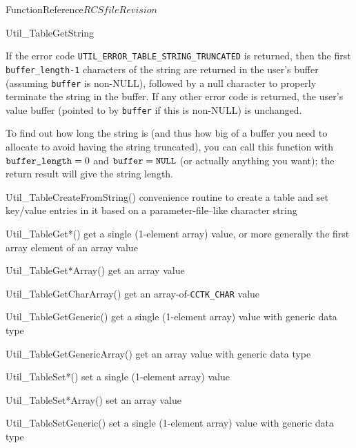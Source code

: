 \begin{cactuspart}{FunctionReference}{$RCSfile$}{$Revision$}
\begin{FunctionDescription}{Util\_TableGetString}
\begin{Discussion}
If the error code \verb|UTIL_ERROR_TABLE_STRING_TRUNCATED| is returned,
then the first \verb|buffer_length-1| characters of the string are
returned in the user's buffer (assuming \verb|buffer| is non-NULL),
followed by a null character to properly terminate the string in the
buffer.  If any other error code is returned, the user's value buffer
(pointed to by \verb|buffer| if this is non-NULL) is unchanged.

To find out how long the string is (and thus how big of a buffer you
need to allocate to avoid having the string truncated), you can call
this function with $\verb|buffer_length| = 0$ and $\verb|buffer| = \verb|NULL|$
(or actually anything you want); the return result will give the
string length.
\end{Discussion}

\begin{SeeAlsoSection}
\begin{SeeAlso}{Util\_TableCreateFromString()}
convenience routine to create a table and set key/value entries
in it based on a parameter-file--like character string
\end{SeeAlso}
\begin{SeeAlso}{Util\_TableGet*()}
get a single (1-element array) value,
or more generally the first array element of an array value
\end{SeeAlso}
\begin{SeeAlso}{Util\_TableGet*Array()}
get an array value
\end{SeeAlso}
\begin{SeeAlso}{Util\_TableGetCharArray()}
get an array-of-\verb|CCTK_CHAR| value
\end{SeeAlso}
\begin{SeeAlso}{Util\_TableGetGeneric()}
get a single (1-element array) value with generic data type
\end{SeeAlso}
\begin{SeeAlso}{Util\_TableGetGenericArray()}
get an array value with generic data type
\end{SeeAlso}
\begin{SeeAlso}{Util\_TableSet*()}
set a single (1-element array) value
\end{SeeAlso}
\begin{SeeAlso}{Util\_TableSet*Array()}
set an array value
\end{SeeAlso}
\begin{SeeAlso}{Util\_TableSetGeneric()}
set a single (1-element array) value with generic data type
\end{SeeAlso}

\end{SeeAlsoSection}
\end{FunctionDescription}
\end{cactuspart}
